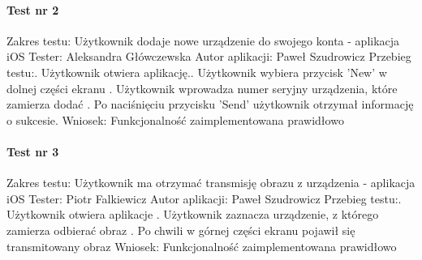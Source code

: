 \documentclass[polish,bachelor,a4paper,oneside]{ppfcmthesis}
\begin{document}
    \paragraph{Test nr 2}
    Zakres testu:\newline
    Użytkownik dodaje nowe urządzenie do swojego konta - aplikacja iOS\newline
    Tester: Aleksandra Główczewska \newline
    Autor aplikacji: Paweł Szudrowicz \newline
    Przebieg testu:. Użytkownik otwiera aplikację.. Użytkownik wybiera przycisk 'New' w dolnej części ekranu . Użytkownik wprowadza numer seryjny urządzenia, które zamierza dodać . Po naciśnięciu przycisku 'Send' użytkownik otrzymał informację o sukcesie.\newline
    Wniosek:\newline
    Funkcjonalność zaimplementowana prawidłowo\newline
    \newline

    \paragraph{Test nr 3}
    Zakres testu:\newline
    Użytkownik ma otrzymać transmisję obrazu z urządzenia - aplikacja iOS\newline
    Tester: Piotr Falkiewicz \newline
    Autor aplikacji: Paweł Szudrowicz \newline
    Przebieg testu:. Użytkownik otwiera aplikacje . Użytkownik zaznacza urządzenie, z którego zamierza odbierać obraz . Po chwili w górnej części ekranu pojawił się transmitowany obraz\newline
    Wniosek:\newline
    Funkcjonalność zaimplementowana prawidłowo\newline
    \newline
\end{document}
